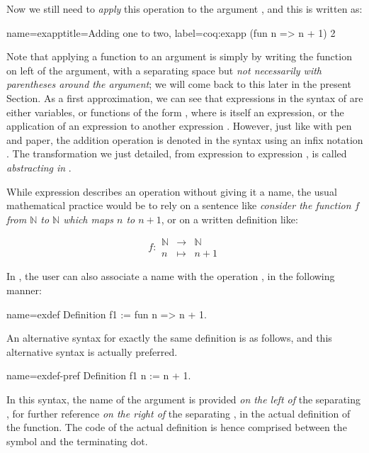 Now we still need to \emph{apply} this operation to the argument
, and this is written as:

\begin{coq}{name=exapp}{title=Adding one to two, label=coq:exapp}
  (fun n => n + 1) 2
\end{coq}
Note that applying a function to an argument is simply by writing the
function on left of the argument, with a separating space but {\em not
  necessarily with parentheses around the argument}; we will come back to this
later in the present Section. As a first approximation, we can see
that expressions in the syntax of \Coq{} are either variables, or
functions of the form , where  is itself an
expression, or the application  of an expression  to
another expression . However, just like with pen and paper, the addition
operation is denoted in the \Coq{} syntax using an infix notation \C{+}.
The transformation we just detailed, from expression  to expression
, is called \emph{abstracting  in  }.

While expression  describes an operation
without giving it a name, the usual mathematical practice would be to
rely on a sentence like {\em consider the function \(f\) from {\(\mathbb{N}\)}
to {\(\mathbb{N}\)} which maps \(n\) to \(n + 1\)}, or on a written
definition like:

\begin{equation}\label{equation:f}
f :
\begin{array}{ccc}
{\mathbb{N}} &\rightarrow& {\mathbb{N}}\\
n &\mapsto& n + 1
\end{array}
\end{equation}

In \Coq{}, the user can also associate a name with the operation
, in the following manner:

\begin{coq}{name=exdef}{}
Definition f1 := fun n => n + 1.
\end{coq}
An alternative syntax for exactly the same definition is as follows,
and this alternative syntax is actually preferred.

\begin{coq}{name=exdef-pref}{}
Definition f1 n := n + 1.
\end{coq}
In this syntax, the name of the argument  is provided
\emph{on the left of} the separating \C{:=}, for further reference
\emph{on the right of} the separating \C{:=}, in the actual
definition of the function. The code of the actual definition is
hence comprised between the \C{:=} symbol and the terminating dot.

